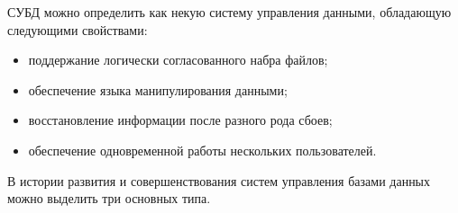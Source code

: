 \documentclass[12pt,a4paper,oneside]{article} %
\begin{document}
СУБД можно определить как некую систему управления данными, \linebreak
обладающую следующими свойствами:

\begin{itemize}
\item поддержание логически согласованного набра файлов;
\item обеспечение языка манипулирования данными;
\item восстановление информации после разного рода сбоев;
\item обеспечение одновременной работы нескольких пользователей.
\end{itemize}

В истории развития и совершенствования систем управления базами \linebreak
данных можно выделить три основных типа.
\end{document}
